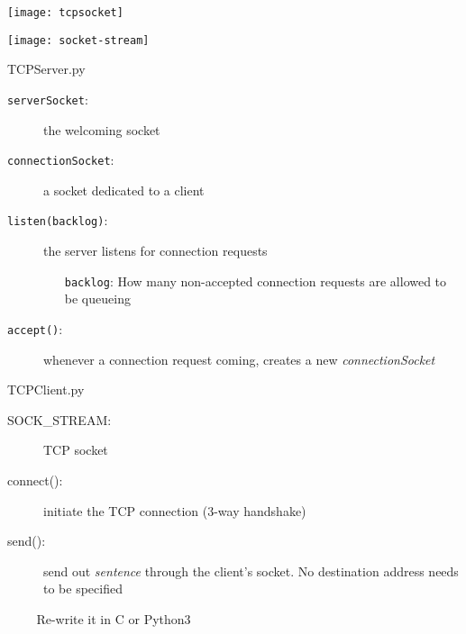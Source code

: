 \begin{minipage}{.5\linewidth}
  \texttt{[image: tcpsocket]}
\end{minipage}\hfill
\begin{minipage}{.45\linewidth}
  \texttt{[image: socket-stream]}
\end{minipage}

\begin{frame}{TCPServer.py}
  \begin{minipage}{.5\linewidth}
  \end{minipage}\hfill
  \begin{minipage}{.47\linewidth}
    \footnotesize
    \begin{description}
    \item[\texttt{serverSocket}:] the welcoming socket
    \item[\texttt{connectionSocket}:] a socket dedicated to a client
    \item[\texttt{listen(backlog)}:] the server listens for connection requests
      \begin{itemize}\scriptsize
      \item[\texttt{backlog}:] How many non-accepted connection requests
          are allowed to be queueing
      \end{itemize}
    \item[\texttt{accept()}:] whenever a connection request coming, creates a new
      \emph{connectionSocket}
    \end{description}
  \end{minipage}
\end{frame}

\begin{frame}{TCPClient.py}
  \begin{minipage}{.5\linewidth}
  \end{minipage}\hfill
  \begin{minipage}{.47\linewidth}
    \begin{description}
    \item[SOCK\_STREAM:] TCP socket
    \item[connect():] initiate the TCP connection (3-way handshake)
    \item[send():] send out \emph{sentence} through the client's socket. No
      destination address needs to be specified
    \end{description}
  \end{minipage}
  \begin{itemize}
  \item[] Re-write it in C or Python3
  \end{itemize}
\end{frame}


